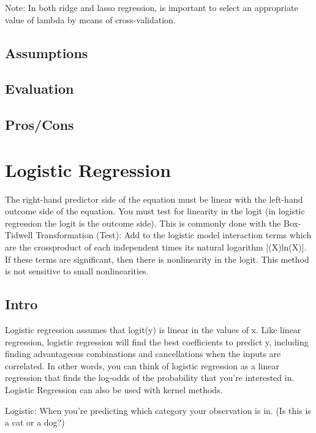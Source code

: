 \documentclass[]{book}
\theoremstyle{definition}
\theoremstyle{definition}
\theoremstyle{definition}
\theoremstyle{remark}
\begin{document}
Note: In both ridge and lasso regression, is important to select an
appropriate value of lambda by means of cross-validation.

\subsection{Assumptions}\label{assumptions-7}

\subsection{Evaluation}\label{evaluation-7}

\subsection{Pros/Cons}\label{proscons-7}

\section{Logistic Regression}\label{logistic-regression}

The right-hand predictor side of the equation must be linear with the
left-hand outcome side of the equation. You must test for linearity in
the logit (in logistic regression the logit is the outcome side). This
is commonly done with the Box-Tidwell Transformation (Test): Add to the
logistic model interaction terms which are the crossproduct of each
independent times its natural logarithm {[}(X)ln(X){]}. If these terms
are significant, then there is nonlinearity in the logit. This method is
not sensitive to small nonlinearities.

\subsection{Intro}\label{intro-8}

Logistic regression assumes that logit(y) is linear in the values of x.
Like linear regression, logistic regression will find the best
coefficients to predict y, including finding advantageous combinations
and cancellations when the inputs are correlated. In other words, you
can think of logistic regression as a linear regression that finds the
log-odds of the probability that you're interested in. Logistic
Regression can also be used with kernel methods.

Logistic: When you're predicting which category your observation is in.
(Is this is a cat or a dog?)
\end{document}
